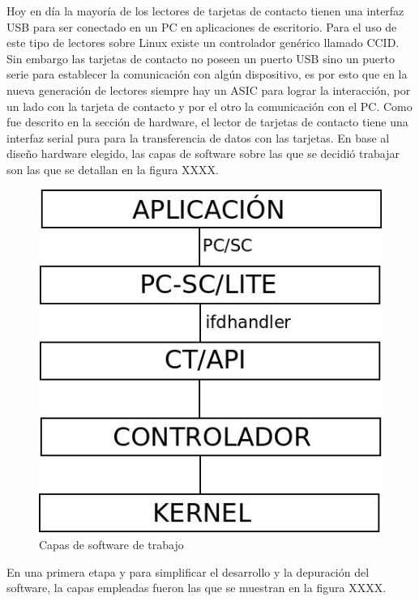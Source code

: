 \bigskip
{}

Hoy en día la mayoría de los lectores de tarjetas de contacto tienen una interfaz USB para ser conectado en un PC en aplicaciones de escritorio. Para el uso de este tipo de lectores sobre Linux existe un controlador genérico llamado CCID.
Sin embargo las tarjetas de contacto no poseen un puerto USB sino un puerto serie para establecer la comunicación con algún dispositivo, es por esto que en la nueva generación de lectores siempre hay un  ASIC para lograr la interacción, por un lado con la tarjeta de contacto y por el otro la comunicación con el PC.
Como fue descrito en la sección de hardware, el lector de tarjetas de contacto tiene una interfaz serial pura para la transferencia de datos con las tarjetas. En base al diseño hardware elegido, las capas de software sobre las que se decidió trabajar son las que se detallan en la figura XXXX. 

\begin{figure}[H]
\centering
  \begin{center}
  \includegraphics[scale=.4]{Imagenes/SW_sc1.jpg} 
  \end{center}
  \caption{Capas de software de trabajo}\label{Fig:capas} 
\end{figure}

En una primera etapa y para simplificar el desarrollo y la depuración del software, la capas empleadas fueron las que se muestran en la figura XXXX.


